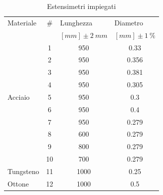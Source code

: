 \documentclass[a4paper,11pt,oneside]{article}
\begin{document}
\begin{table}
	\centering
	\begin{tabular}{lccc}
		    Materiale & \#& \multicolumn{1}{l}{Lunghezza}        & \multicolumn{1}{l}{Diametro}\\ 
		    &&$[\si{mm}] \pm\SI{2}{mm}$&$[\si{mm}] \pm\SI{1}{\percent}$\\
		\hline
\multirow{9}{*}{Acciaio} & {\cellcolor[rgb]{0.753,0.753,0.753}}1  & {\cellcolor[rgb]{0.753,0.753,0.753}}950  & {\cellcolor[rgb]{0.753,0.753,0.753}}0.33   \\
& 2 & 950 & 0.356  \\
& {\cellcolor[rgb]{0.753,0.753,0.753}}3  & {\cellcolor[rgb]{0.753,0.753,0.753}}950  & {\cellcolor[rgb]{0.753,0.753,0.753}}0.381  \\
& 4 & 950 & 0.305  \\ & {\cellcolor[rgb]{0.753,0.753,0.753}}5  & {\cellcolor[rgb]{0.753,0.753,0.753}}950  & {\cellcolor[rgb]{0.753,0.753,0.753}}0.3    \\
& 6 & 950 & 0.4                                        \\
& {\cellcolor[rgb]{0.753,0.753,0.753}}7  & {\cellcolor[rgb]{0.753,0.753,0.753}}950  & {\cellcolor[rgb]{0.753,0.753,0.753}}0.279  \\
& 8 & 600 & 0.279                                      \\
& {\cellcolor[rgb]{0.753,0.753,0.753}}9  & {\cellcolor[rgb]{0.753,0.753,0.753}}800  & {\cellcolor[rgb]{0.753,0.753,0.753}}0.279  \\
& 10 & 700 & 0.279                                      \\

Tungsteno & {\cellcolor[rgb]{0.753,0.753,0.753}}11 &{\cellcolor[rgb]{0.753,0.753,0.753}} 1000 &{\cellcolor[rgb]{0.753,0.753,0.753}} 0.25\\
Ottone                   & 12 & 1000 & 0.5   
\end{tabular}
	\caption{Estensimetri impiegati}
	\label{tab:caratteristiche_estensimetri}
\end{table}
\end{document}
